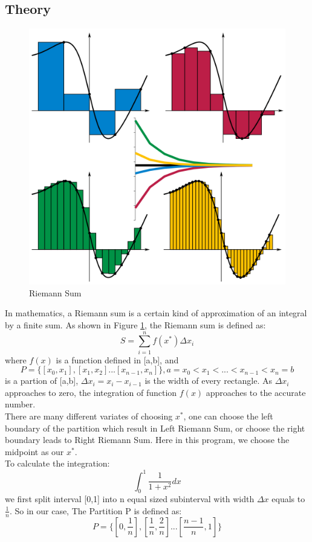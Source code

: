 \documentclass[article]{scrartcl}
\begin{document}
\subsection{Theory}
\begin{figure}[h]
  \includegraphics{../figs/Riemann_sum_convergence.png}
  \centering
  \caption{Riemann Sum\cite{riemannsum}}
  \label{fig:riemann}
\end{figure}
In mathematics, a Riemann sum is a certain kind of approximation of an integral by a finite sum.
As shown in Figure \ref{fig:riemann}, the Riemann sum is defined as:
$$
S = \sum_{i=1}^{n}f(x^{*})\Delta x_i
$$ 
where $f(x)$ is a function defined in [a,b], and 
$$P=\{[x_0,x_1],[x_1,x_2]... [x_{n-1},x_n]\}, a = x_0 < x_1 < ...<x_{n-1}<x_n=b$$
is a partion of [a,b], $\Delta x_i = x_i - x_{i-1}$ is the width of every rectangle.
As $\Delta x_i$ approaches to zero, the integration of function $f(x)$ approaches to the accurate number.
\\
There are many different variates of choosing $x^{*}$, one can choose the left boundary of the partition which 
result in Left Riemann Sum, or choose the right boundary leads to Right Riemann Sum. Here in this program, we 
choose the midpoint as our $x^*$.\\
To calculate the integration:
$$
\int_{0}^1\frac{1}{1+x^2}dx
$$
we first split interval [0,1] into n equal sized subinterval with width $\Delta x$ equals to $\frac{1}{n}$.
So in our case, The Partition P is defined as:
$$P=\{[0,\frac{1}{n}],[\frac{1}{n},\frac{2}{n}]... [\frac{n-1}{n},1]\}$$
\end{document}
